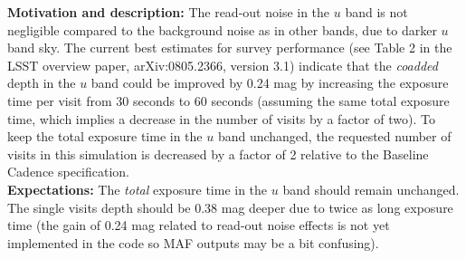



{\bf Motivation and description:} The read-out noise in the $u$ band is
not negligible compared to the background noise as in other bands, due
to darker $u$ band sky. The current best estimates for survey
performance (see Table 2 in the LSST overview paper, arXiv:0805.2366,
version 3.1) indicate that the {\it coadded} depth in the $u$ band
could be improved by 0.24 mag by increasing the exposure time per
visit from 30 seconds to 60 seconds
(assuming the same total exposure time, which implies a
decrease in the number of visits by a factor of two). To keep the
total exposure time in the $u$ band unchanged, the requested number of
visits in this simulation is decreased by a factor of 2 relative to the
Baseline Cadence specification. \\

{\bf Expectations:} The {\it total} exposure time in the $u$ band should
remain unchanged. The single visits depth should be 0.38 mag deeper
due to twice as long exposure time (the gain of 0.24 mag related to
read-out noise effects is not yet implemented in the \OpSim code so MAF
outputs may be a bit confusing). \\

